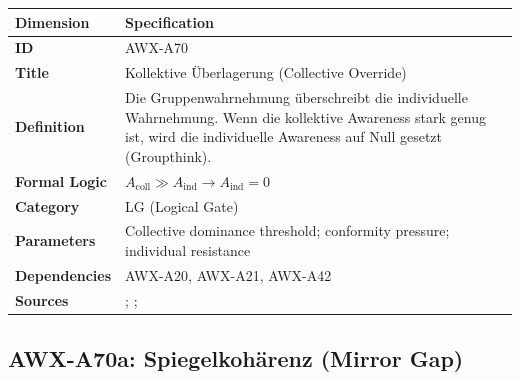 \begin{table}[htbp]
\small
\begin{tabular}{p{3cm}p{11cm}}
\toprule
\textbf{Dimension} & \textbf{Specification} \\
\midrule
\textbf{ID} & AWX-A70 \\
\textbf{Title} & Kollektive Überlagerung (Collective Override) \\
\textbf{Definition} & Die Gruppenwahrnehmung überschreibt die individuelle Wahrnehmung. Wenn die kollektive Awareness stark genug ist, wird die individuelle Awareness auf Null gesetzt (Groupthink). \\
\textbf{Formal Logic} & $A_{\text{coll}} \gg A_{\text{ind}} \rightarrow A_{\text{ind}} = 0$ \\
\textbf{Category} & LG (Logical Gate) \\
\textbf{Parameters} & Collective dominance threshold; conformity pressure; individual resistance \\
\textbf{Dependencies} & AWX-A20, AWX-A21, AWX-A42 \\
\textbf{Sources} & \citet{janis1972groupthink}; \citet{asch1951effects}; \citet{sunstein2009going} \\
\bottomrule
\end{tabular}
\end{table}


\subsection{AWX-A70a: Spiegelkohärenz (Mirror Gap)}

